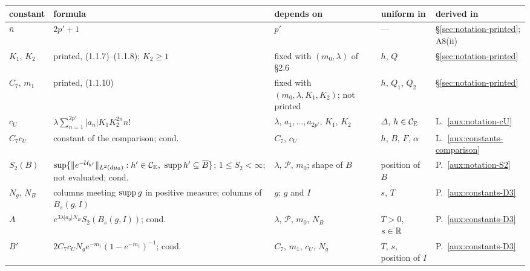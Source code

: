 \begin{center}
\footnotesize
\begin{tabular}{@{}p{}p{}p{}p{}p{}@{}}
\toprule
constant & formula & depends on & uniform in & derived in\\
\midrule
$\bar n$ & $2p'+1$ & $p'$ & --- & \S\ref{sec:notation-printed}; A8(ii)\\
$K_1$, $K_2$ & printed, (1.1.7)--(1.1.8); $K_2\ge1$ & fixed with $(m_0,\lambda)$ of \S2.6 &
$h$, $Q$ & \S\ref{sec:notation-printed}\\
$C_7$, $m_1$ & printed, (1.1.10) & fixed with $(m_0,\lambda,K_1,K_2)$; not printed &
$h$, $Q_1$, $Q_2$ & \S\ref{sec:notation-printed}\\
$c_U$ & $\lambda\sum_{n=1}^{2p'}|a_n|K_1K_2^{2n}n!$ & $\lambda$, $a_1,\dots,a_{2p'}$, $K_1$,
$K_2$ & $\Delta$, $h\in\mathcal{C}_{\mathrm E}$ & L.~\ref{aux:notation-cU}\\
$C_7c_U$ & constant of the comparison; cond. & $C_7$, $c_U$ & $h$, $B$, $F$, $\alpha$ &
L.~\ref{aux:constants-comparison}\\
$S_2(B)$ & $\sup\{\|e^{-\Uc_{h'}}\|_{L^2(\dmu)}:h'\in\CE,\ \supp h'\subseteq\overline B\}$;
$1\le S_2<\infty$; not evaluated; cond. & $\lambda$, $\mathscr P$, $m_0$; shape of $B$ &
position of $B$ & P.~\ref{aux:notation-S2}\\
$N_g$, $N_B$ & columns meeting $\operatorname{supp} g$ in positive measure; columns of $B_s(g,I)$ & $g$;
$g$ and $I$ & $s$, $T$ & P.~\ref{aux:constants-D3}\\
$A$ & $e^{3\lambda|a_0|N_B}S_2(B_s(g,I))$; cond. & $\lambda$, $\mathscr P$, $m_0$, $N_B$ &
$T>0$, $s\in\mathbb{R}$ & P.~\ref{aux:constants-D3}\\
$B'$ & $2C_7c_UN_ge^{-m_1}(1-e^{-m_1})^{-1}$; cond. & $C_7$, $m_1$, $c_U$, $N_g$ & $T$, $s$, position
of $I$ & P.~\ref{aux:constants-D3}\\
\bottomrule
\end{tabular}
\end{center}

